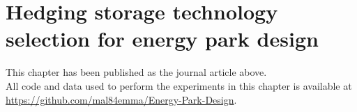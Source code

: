 
\chapter{Hedging storage technology selection for energy park design} \label{chap:parks}

\graphicspath{{Parks/Figs/}}

\begin{cbox}{}

    \noindent{\color{black!50}\rule{\textwidth}{0.4mm}}\vspace{2mm}

    \noindent
    This chapter has been published as the journal article above.\\

    \noindent
    All code and data used to perform the experiments in this chapter is available at \url{https://github.com/mal84emma/Energy-Park-Design}.
\end{cbox}

\newpage


